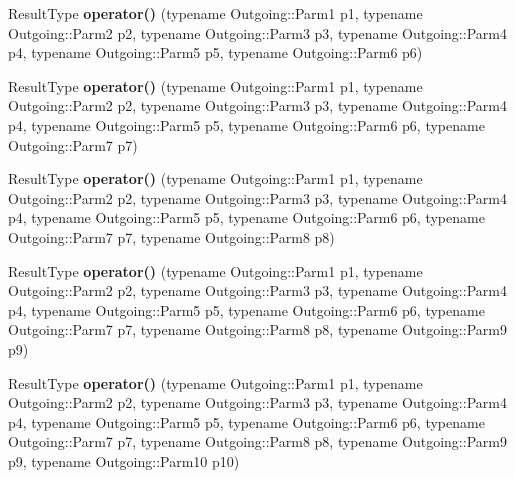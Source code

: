 \begin{DoxyCompactItemize}
\item 
\hypertarget{classutilspp_1_1BinderFirst_ab413186751cda0cf7bf9f800f7a11672}{Result\-Type {\bfseries operator()} (typename Outgoing\-::\-Parm1 p1, typename Outgoing\-::\-Parm2 p2, typename Outgoing\-::\-Parm3 p3, typename Outgoing\-::\-Parm4 p4, typename Outgoing\-::\-Parm5 p5, typename Outgoing\-::\-Parm6 p6)}\label{classutilspp_1_1BinderFirst_ab413186751cda0cf7bf9f800f7a11672}

\item 
\hypertarget{classutilspp_1_1BinderFirst_a97b4cb9d2beced3402eced8cae8b8d45}{Result\-Type {\bfseries operator()} (typename Outgoing\-::\-Parm1 p1, typename Outgoing\-::\-Parm2 p2, typename Outgoing\-::\-Parm3 p3, typename Outgoing\-::\-Parm4 p4, typename Outgoing\-::\-Parm5 p5, typename Outgoing\-::\-Parm6 p6, typename Outgoing\-::\-Parm7 p7)}\label{classutilspp_1_1BinderFirst_a97b4cb9d2beced3402eced8cae8b8d45}

\item 
\hypertarget{classutilspp_1_1BinderFirst_adba1475c298df0c685b512f5ab839a93}{Result\-Type {\bfseries operator()} (typename Outgoing\-::\-Parm1 p1, typename Outgoing\-::\-Parm2 p2, typename Outgoing\-::\-Parm3 p3, typename Outgoing\-::\-Parm4 p4, typename Outgoing\-::\-Parm5 p5, typename Outgoing\-::\-Parm6 p6, typename Outgoing\-::\-Parm7 p7, typename Outgoing\-::\-Parm8 p8)}\label{classutilspp_1_1BinderFirst_adba1475c298df0c685b512f5ab839a93}

\item 
\hypertarget{classutilspp_1_1BinderFirst_a190a42dd2376ad4a7c3a8bfba0a0ef3f}{Result\-Type {\bfseries operator()} (typename Outgoing\-::\-Parm1 p1, typename Outgoing\-::\-Parm2 p2, typename Outgoing\-::\-Parm3 p3, typename Outgoing\-::\-Parm4 p4, typename Outgoing\-::\-Parm5 p5, typename Outgoing\-::\-Parm6 p6, typename Outgoing\-::\-Parm7 p7, typename Outgoing\-::\-Parm8 p8, typename Outgoing\-::\-Parm9 p9)}\label{classutilspp_1_1BinderFirst_a190a42dd2376ad4a7c3a8bfba0a0ef3f}

\item 
\hypertarget{classutilspp_1_1BinderFirst_adbc946ab09fb1e5d0937e65a1b4ba4d8}{Result\-Type {\bfseries operator()} (typename Outgoing\-::\-Parm1 p1, typename Outgoing\-::\-Parm2 p2, typename Outgoing\-::\-Parm3 p3, typename Outgoing\-::\-Parm4 p4, typename Outgoing\-::\-Parm5 p5, typename Outgoing\-::\-Parm6 p6, typename Outgoing\-::\-Parm7 p7, typename Outgoing\-::\-Parm8 p8, typename Outgoing\-::\-Parm9 p9, typename Outgoing\-::\-Parm10 p10)}\label{classutilspp_1_1BinderFirst_adbc946ab09fb1e5d0937e65a1b4ba4d8}


\end{DoxyCompactItemize}
